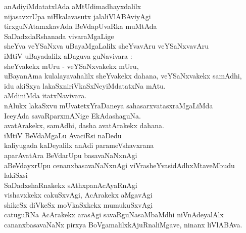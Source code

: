 \begin{entry}
\begin{shl}
anAdiyiMdatatxlAda aMtUdimadhayxdalilx\\
nijasavxrUpa niHkalavasutx jalaliVlABAviyAgi\\
tirxguNAtamxkavAda BeVdapUvaRka muMtAda\\
SaDadxdaRshanada vivaraMgaLige\\
sheYva veYSaNxva uBayaMgaLalilx sheYvavAru veYSaNxvavAru\\
iMtiV uBayadalilx aDaguva guNavivara :\\
sheYvakekx mUru - veYSaNxvakekx mUru,\\
uBayanAma kulalayavahalilx sheYvakekx dahana, veYSaNxvakekx samAdhi,\\
idu akiSxya lakaSxniriVkaSxNeyiMdatatxNa mAtu.\\
aMdiniMda itatxNavivara.\\
nAlukx lakaSxvu mUvatetxYraDaneya sahasarxvatasxraMgaLiMda\\
IceyAda savaRparxmANige EkAdashaguNa.\\
avatArakekx, samAdhi, dasha avatArakekx dahana.\\
iMtiV BeVdaMgaLu AvaciRsi naDedu\\
kaliyugada kaDeyalilx anAdi parameVshavxrana\\
aparAvatAra BeVdarUpu basavaNaNxnAgi\\
aBeVdayxrUpu cenanxbasavaNaNxnAgi viVrasheYvasidAdhxMtaveMbudu lakiSxsi\\
SaDadxshaRnakekx sAthxpanAcAyaRnAgi\\
vishavxkekx cakuSxvAgi, AcArakekx aMgavAgi\\
shikeSx diVkeSx moVkaSxkekx mumukuSxvAgi\\
catuguRNa AcArakekx arasAgi savaRguNasaMbaMdhi niVnAdeyalAlx\\
cananxbasavaNaNx pirxya BoVgamalilxkAjuRnaliMgave, ninanx liVlABAva.
\end{shl}
\end{entry}

\begin{entry}
\end{entry}

